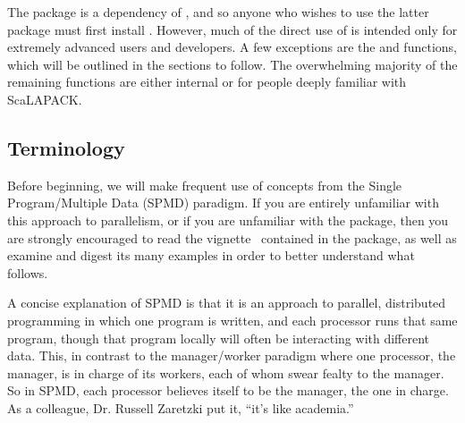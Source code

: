 The  package is a dependency of , and so anyone who wishes to use the latter package must first install .  However, much of the direct use of  is intended only for extremely advanced users and developers.  A few exceptions are the  and  functions, which will be outlined in the sections to follow.  The overwhelming majority of the remaining functions are either internal or for people deeply familiar with ScaLAPACK.





\subsection{Terminology}
Before beginning, we will make frequent use of concepts from the Single Program/Multiple Data (SPMD) paradigm.  If you are entirely unfamiliar with this approach to parallelism, or if you are unfamiliar with the  package, then you are strongly encouraged to read the vignette~\citep{Chen2012pbdMPIvignette} contained in the  package, as well as examine and digest its many examples in order to better understand what follows.

A concise explanation of SPMD is that it is an approach to parallel, distributed programming in which one program is written, and each processor runs that same program, though that program locally will often be interacting with different data.  This, in contrast to the manager/worker paradigm where one processor, the manager, is in charge of its workers, each of whom swear fealty to the manager.  So in SPMD, each processor believes itself to be the manager, the one in charge.  As a colleague, Dr. Russell Zaretzki put it, ``it's like academia.''
